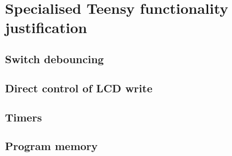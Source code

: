 \documentclass[10pt, titlepage]{article}
\begin{document}
\clearpage
\section{Specialised Teensy functionality justification}

\subsection{Switch debouncing}


\subsection{Direct control of LCD write}


\subsection{Timers}


\subsection{Program memory}
\end{document}
